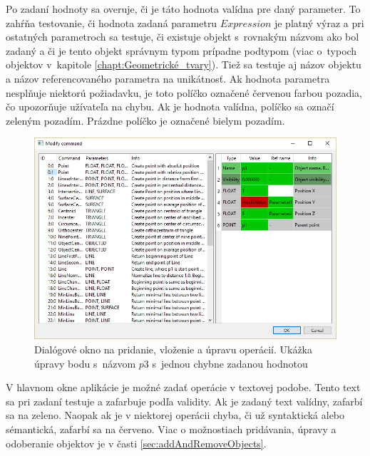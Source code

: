 Po zadaní hodnoty sa overuje, či je táto hodnota valídna pre daný parameter. To zahŕňa testovanie, či hodnota zadaná parametru $Expression$ je platný výraz a pri ostatných parametroch sa testuje, či existuje objekt s~rovnakým názvom ako bol zadaný a či je tento objekt správnym typom prípadne podtypom (viac o~typoch objektov v~kapitole  \ref{chapt:Geometrické_tvary}). Tiež sa testuje aj názov objektu a názov referencovaného parametra na unikátnosť.
Ak hodnota parametra nesplňuje niektorú požiadavku, je toto políčko označené červenou farbou pozadia, čo upozorňuje užívateľa na chybu. Ak je hodnota valídna, políčko sa označí zeleným pozadím. Prázdne políčko je označené bielym pozadím. 

\begin{figure}[H]
	\centering
	\includegraphics[width=1\textwidth]{obrazky-figures/Dialog.png}
	\caption{Dialógové okno na pridanie, vloženie a úpravu operácií. Ukážka úpravy bodu s~názvom $p3$ s~jednou chybne zadanou hodnotou }
	\label{fig:dialogWindow}
\end{figure}
V hlavnom okne aplikácie je možné zadať operácie v textovej podobe. Tento text sa pri zadaní testuje a zafarbuje podľa validity. Ak je zadaný text valídny, zafarbí sa na zeleno. Naopak ak je v niektorej operácii chyba, či už syntaktická alebo sémantická, zafarbí sa na červeno. Viac o možnostiach pridávania, úpravy a odoberanie objektov je v časti \ref{sec:addAndRemoveObjects}.








